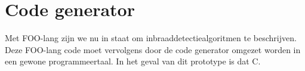 
\section{Code generator}
\label{section:devel-codegen}

Met FOO-lang zijn we nu in staat om inbraaddetectiealgoritmen te beschrijven.
Deze FOO-lang code moet vervolgens door de code generator omgezet worden in een
gewone programmeertaal. In het geval van dit prototype is dat C.







